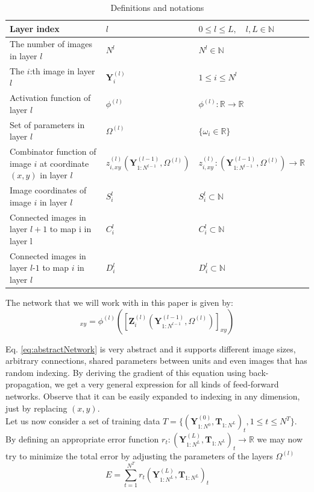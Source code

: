 \documentclass[a4paper,10pt]{article}
\theoremstyle{definition}
\begin{document}
\begin{table}[H]
	\centering
	\begin{tabular}{|p{4cm}| l| l|}
		\hline
		Layer index& $l$& $0\leq l \leq L, \quad l,L \in \mathbb{N}$ \\
		\hline
		The number of images in layer $l$ & $N^{l}$ & $N^{l} \in \mathbb{N}$\\
		\hline
		The $i$:th image in layer $l$ & $\pmb{Y}_i^{(l)}$  & $ 1 \leq i \leq N^{l}$ \\
		\hline
		Activation function of layer $l$ & $\phi^{(l)}$ & $\phi^{(l)} : \mathbb{R} \rightarrow \mathbb{R}$\\		
		\hline
		Set of parameters in layer $l$ & $\Omega^{(l)}$  & $\{\omega_i \in \mathbb{R}\}$\\
		\hline
		Combinator function of image $i$ at coordinate $(x,y)$ in layer $l$ & $z^{(l)}_{i,xy}(\pmb{Y}^{(l-1)}_{1:N^{l-1}}, \Omega^{(l)})$& $z^{(l)}_{i,xy}: (\pmb{Y}^{(l-1)}_{1:N^{l-1}}, \Omega^{(l)}) \rightarrow \mathbb{R}$\\
		\hline
		Image coordinates of image $i$ in layer $l$ & $S^l_i$ & $S^l_i \subset \mathbb{N}$\\
		\hline
		Connected images in layer $l+1$ to map i in layer l& $C^l_i$& $C^l_i \subset \mathbb{N}$ \\
		\hline
		 Connected images in layer $l$-$1$ to map $i$ in layer $l$& $D_i^l$& $D^l_i \subset \mathbb{N}$\\
		 \hline
	\end{tabular}
	\caption{Definitions and notations}
	\label{tab:notations}
\end{table}
The network that we will work with in this paper is given by:
\begin{equation}
[\pmb{Y}_i^{(l)}]_{xy} = \phi^{(l)}([\pmb{Z}^{(l)}_{i}(\pmb{Y}^{(l-1)}_{1:N^{l-1}}, \Omega^{(l)})]_{xy})
\label{eq:abstractNetwork}
\end{equation}

Eq. \ref{eq:abstractNetwork} is very abstract and it supports different image sizes, arbitrary connections, shared parameters between units and even images that has random indexing. By deriving the gradient of this equation using back-propagation, we get a very general expression for all kinds of feed-forward networks. Observe that it can be easily expanded to indexing in any dimension, just by replacing $(x,y)$.\\

Let us now consider a set of training data $T = \{(\pmb{Y}_{1:N^{0}}^{(0)}, \pmb{T}_{1:N^L})_t,  1 \leq t \leq N^T \}$. By defining an appropriate error function $r_t : (\pmb{Y}_{1:N^L}^{(L)}, \pmb{T}_{1:N^L})_t \rightarrow \mathbb{R}$ we may now try to minimize the total error by adjusting the parameters of the layers $\Omega^{(l)}$
\begin{equation}
E = \sum_{t = 1}^{N^T}r_t(\pmb{Y}_{1:N^L}^{(L)}, \pmb{T}_{1:N^L})_t
\end{equation}
\end{document}
